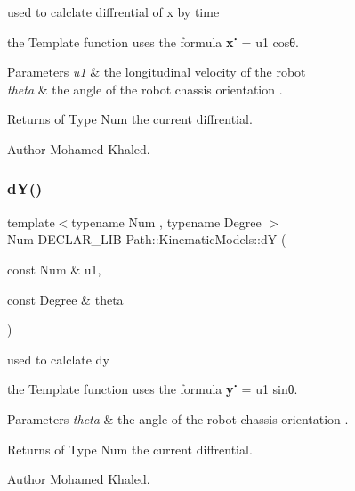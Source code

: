 used to calclate diffrential of x by time 

the Template function uses the formula {\bfseries x˙} = u1 cosθ. 
\begin{DoxyParams}{Parameters}
{\em u1} & the longitudinal velocity of the robot \\
\hline
{\em theta} & the angle of the robot chassis orientation . \\
\hline
\end{DoxyParams}
\begin{DoxyReturn}{Returns}
of Type Num the current diffrential. 
\end{DoxyReturn}
\begin{DoxyAuthor}{Author}
Mohamed Khaled. 
\end{DoxyAuthor}
\mbox{\label{namespace_path_1_1_kinematic_models_a872e84d8a115db786624f3fc8e6790a4}} 
\subsubsection{\texorpdfstring{d\+Y()}{dY()}\hspace{0.1cm}{\footnotesize\ttfamily [1/2]}}
{\footnotesize\ttfamily template$<$typename Num , typename Degree $>$ \\
Num D\+E\+C\+L\+A\+R\+\_\+\+L\+IB Path\+::\+Kinematic\+Models\+::dY (\begin{DoxyParamCaption}\item[{const Num \&}]{u1,  }\item[{const Degree \&}]{theta }\end{DoxyParamCaption})}



used to calclate dy 

the Template function uses the formula {\bfseries y˙} = u1 sinθ. 
\begin{DoxyParams}{Parameters}
{\em theta} & the angle of the robot chassis orientation . \\
\hline
\end{DoxyParams}
\begin{DoxyReturn}{Returns}
of Type Num the current diffrential. 
\end{DoxyReturn}
\begin{DoxyAuthor}{Author}
Mohamed Khaled. 
\end{DoxyAuthor}
\mbox{\label{namespace_path_1_1_kinematic_models_a11aaf1219f56249da986fe9e06942d22}} 
